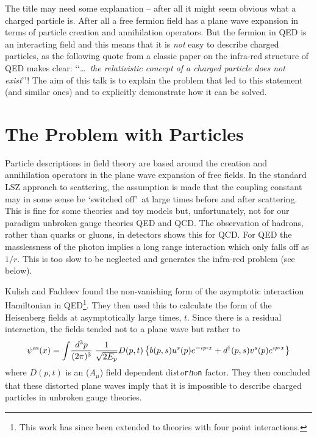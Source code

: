 \documentclass[12pt,a4paper]{article}
\newcommand{\psias}{\psi^\as}
\newcommand{\dd}{{d^{\dag}}}
\newcommand{\intp}{\int\!\frac{d^3p}{(2\pi)^3}\;}
\newcommand{\ecd}{{\cdot}}
\newcommand{\as}{{\mathrm{as}}}
\begin{document}
The title may need some explanation -- after all it might seem obvious
what a charged particle is. After all a free fermion field has a plane wave expansion in terms of particle
creation and annihilation operators.  But the fermion in QED is an interacting field and this
means that it is \emph{not} easy to describe charged particles, as the following
quote from a classic paper\cite{Kulish:1970ut} on the infra-red
structure of QED makes clear: \lq\lq \dots\ \textsl{the relativistic concept of a
charged particle does not exist}\rq\rq! The aim of this talk is to explain  the problem
that led to this statement (and similar ones) and to explicitly demonstrate how it can be solved.

\section*{The Problem with Particles}

Particle descriptions in field theory are based around the creation and annihilation operators
in the plane wave expansion of free fields. In the standard LSZ approach to scattering, the assumption is made
that the coupling constant may in some sense be \lq switched off\rq\ at large times before and after scattering.
This is fine for some theories and toy models but, unfortunately, not for our paradigm unbroken gauge theories
QED and QCD. The observation of hadrons, rather than quarks or gluons, in detectors
shows this for QCD. For QED the masslessness of the photon implies a long range interaction
which only falls off as $1/r$. This is too slow to be neglected and generates the infra-red problem (see below).

Kulish and Faddeev\cite{Kulish:1970ut} found the non-vanishing form of the asymptotic
interaction Hamiltonian in QED\footnote{This work has since been extended to theories with four point
interactions\cite{Horan:1999ba}.}. They then used this to calculate the form of the Heisenberg fields
at asymptotically large times, $t$.
Since there is a residual interaction, the fields tended not to a plane wave but rather to
\begin{equation}
\psias(x)=\intp\frac1{\sqrt{2E_{\smash{p}}}}D(p,t)
\left\{
b(p,s)u^s(p)e^{-ip\ecd x}+
\dd(p,s)v^s(p)e^{ip\ecd x}
\right\}
\end{equation}
where $D(p,t)$ is an ($A_\mu$) field dependent
\textsf{d}\textmd{i}\emph{s}t\textsl{o}\texttt{r}\textit{t}\textsc{i}\textsf{o}\texttt{n} factor.
They then concluded that these distorted plane waves imply that it is impossible to describe charged
particles in unbroken gauge theories.
\end{document}
